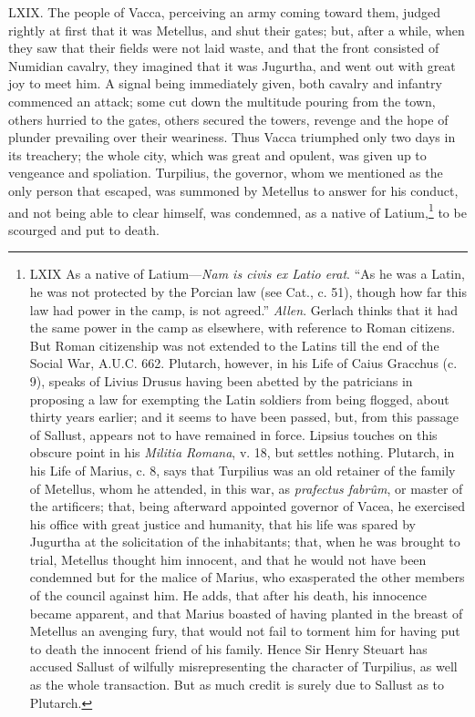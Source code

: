 LXIX. The people of Vacca, perceiving an army coming toward them,
judged rightly at first that it was Metellus, and shut their gates;
but, after a while, when they saw that their fields were not laid
waste, and that the front consisted of Numidian cavalry, they imagined
that it was Jugurtha, and went out with great joy to meet him. A
signal being immediately given, both cavalry and infantry commenced an
attack; some cut down the multitude pouring from the town, others
hurried to the gates, others secured the towers, revenge and the hope
of plunder prevailing over their weariness. Thus Vacca triumphed only
two days in its treachery; the whole city, which was great and
opulent, was given up to vengeance and spoliation. Turpilius, the
governor, whom we mentioned as the only person that escaped, was
summoned by Metellus to answer for his conduct, and not being able to
clear himself, was condemned, as a native of Latium,\footnote{LXIX As a native of Latium—\emph{Nam is civis ex Latio erat}.
``As he was a Latin, he was not protected by the Porcian law (see Cat.,
c. 51), though how far this law had power in the camp, is not agreed.''
\emph{Allen}. Gerlach thinks that it had the same power in the camp as
elsewhere, with reference to Roman citizens. But Roman citizenship was
not extended to the Latins till the end of the Social War, A.U.C. 662.
Plutarch, however, in his Life of Caius Gracchus (c. 9), speaks of
Livius Drusus having been abetted by the patricians in proposing a law
for exempting the Latin soldiers from being flogged, about thirty
years earlier; and it seems to have been passed, but, from this
passage of Sallust, appears not to have remained in force. Lipsius
touches on this obscure point in his \emph{Militia Romana}, v. 18, but
settles nothing. Plutarch, in his Life of Marius, c. 8, says that
Turpilius was an old retainer of the family of Metellus, whom he
attended, in this war, as \emph{prafectus fabrûm}, or master of the
artificers; that, being afterward appointed governor of Vacea, he
exercised his office with great justice and humanity, that his life
was spared by Jugurtha at the solicitation of the inhabitants; that,
when he was brought to trial, Metellus thought him innocent, and that
he would not have been condemned but for the malice of Marius, who
exasperated the other members of the council against him. He adds,
that after his death, his innocence became apparent, and that Marius
boasted of having planted in the breast of Metellus an avenging fury,
that would not fail to torment him for having put to death the
innocent friend of his family. Hence Sir Henry Steuart has accused
Sallust of wilfully misrepresenting the character of Turpilius, as
well as the whole transaction. But as much credit is surely due to
Sallust as to Plutarch.} to be
scourged and put to death.

